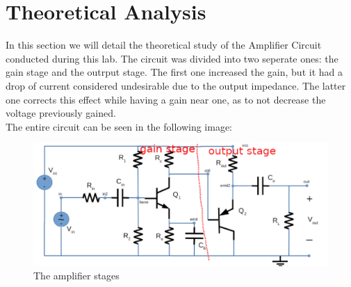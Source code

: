 \section{Theoretical Analysis}
\label{sec:analysis}

In this section we will detail the theoretical study of the Amplifier Circuit conducted during this lab. The circuit was divided into two seperate ones: the gain stage and the outrput stage. The first one increased the gain, but it had a drop of current considered undesirable due to the output impedance. The latter one corrects this effect while having a gain near one, as to not decrease the voltage previously gained.\\
The entire circuit can be seen in the following image:\\



\begin{figure} [!htb] 
  \includegraphics[width=\linewidth]{circuitsep.jpeg}
  \caption{The amplifier stages}
  \label{fig:stage}
  \endminipage\hfill
\end{figure}



